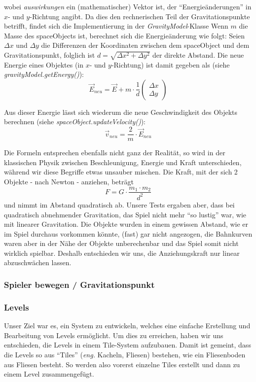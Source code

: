 \documentclass[12pt,a4paper]{scrartcl}
\newcommand{\q}[1]{``#1''}
\begin{document}
wobei \textit{auswirkungen} ein (mathematischer) Vektor ist, der \q{Energieänderungen} in $x$- und $y$-Richtung angibt.
Da dies den rechnerischen Teil der Gravitationspunkte betrifft, findet sich die Implementierung in der \textit{GravityModel}-Klasse
Wenn $m$ die Masse des spaceObjects ist, berechnet sich die Energieänderung wie folgt:
Seien $\Delta x$ und $\Delta y$ die Differenzen der Koordinaten zwischen dem spaceObject und dem Gravitationspunkt,
folglich ist $d = \sqrt{\Delta x^2 + \Delta y^2}$ der direkte Abstand. Die neue Energie eines Objektes (in $x$- und $y$-Richtung)
ist damit gegeben als (siehe \textit{gravityModel.getEnergy()}): 
\[ \vec{E}_{neu} = \vec{E} + m \cdot \frac{1}{d} \begin{pmatrix}\Delta x \\ \Delta y\end{pmatrix} \]

Aus dieser Energie lässt sich wiederum die neue Geschwindigkeit des Objekts berechnen (siehe \textit{spaceObject.updateVelocity()}):
\[ \vec{v}_{neu} = \frac{2}{m} \cdot \vec{E}_{neu}\] 

Die Formeln entsprechen ebenfalls nicht ganz der Realität, so wird in der klassischen Physik zwischen Beschleunigung, Energie und Kraft unterschieden,
während wir diese Begriffe etwas unsauber mischen. Die Kraft, mit der sich 2 Objekte - nach Newton - anziehen, beträgt
\[ F = G \cdot \frac{m_1 \cdot m_2}{d^2} \]
und nimmt im Abstand quadratisch ab. Unsere Tests ergaben aber, dass bei quadratisch abnehmender Gravitation, das
Spiel nicht mehr \q{so lustig} war, wie mit linearer Gravitation. Die Objekte wurden in einem gewissen Abstand, wie er
im Spiel durchaus vorkommen könnte, (fast) gar nicht angezogen, die Bahnkurven waren aber in der Nähe der Objekte
unberechenbar und das Spiel somit nicht wirklich spielbar. Deshalb entschieden wir uns, die Anziehungskraft
nur linear abzuschwächen lassen.


\subsubsection{Spieler bewegen / Gravitationspunkt}


\subsubsection{Levels}
Unser Ziel war es, ein System zu entwickeln, welches eine einfache Erstellung und Bearbeitung von Levels ermöglicht. Um dies zu erreichen, haben wir uns entschieden, die Levels in einem Tile-System aufzubauen. Damit ist gemeint, dass die Levels so aus \q{Tiles} (\textit{eng.} Kacheln, Fliesen) bestehen, wie ein Fliesenboden aus Fliesen besteht. So werden also vorerst einzelne Tiles erstellt und dann zu einem Level zusammengefügt.\\
\end{document}
